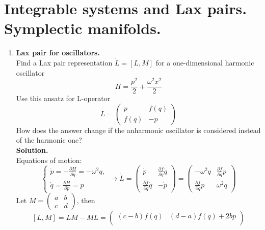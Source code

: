 \documentclass[12pt]{article}
\theoremstyle{definition}
\begin{document}
\section{Integrable systems and Lax pairs. Symplectic manifolds.}
\begin{enumerate}
    \item \textbf{Lax pair for oscillators.}\\
    Find a Lax pair representation $\dot{L}=[L,M]$ for a one-dimensional harmonic oscillator
    \begin{equation}
        H=\frac{p^2}{2}+\frac{\omega^2x^2}{2}
    \end{equation}
    Use this ansatz for L-operator
    \begin{equation}
        L=\begin{pmatrix}
            p & f(q)\\
            f(q) & -p
        \end{pmatrix}
    \end{equation}
    How does the answer change if the anharmonic oscillator is considered instead of the harmonic one?\\
    \textbf{Solution.}\\
    Equations of motion:
    \begin{equation}\label{eq2}
        \begin{cases}
            \dot{p}=-\frac{\partial H}{\partial q}=-\omega^2 q,\\
            \dot{q}=\frac{\partial H}{\partial p}=p
        \end{cases}\rightarrow\dot{L}=\begin{pmatrix}
            \dot{p} & \frac{\partial f}{\partial q}\dot{q}\\
            \frac{\partial f}{\partial q}\dot{q} & -\dot{p}
        \end{pmatrix}=\begin{pmatrix}
            -\omega^2q & \frac{\partial f}{\partial q}p\\
            \frac{\partial f}{\partial q}p & \omega^2q
        \end{pmatrix}
    \end{equation}
    Let $M=\begin{pmatrix}
    a & b\\
    c & d
    \end{pmatrix}$, then
    \begin{equation}\label{eq3}
        [L,M]=LM-ML=\begin{pmatrix}
            (c-b)f(q) & (d-a)f(q)+2bp\\

\end{pmatrix}
\end{equation}
\end{enumerate}
\end{document}
